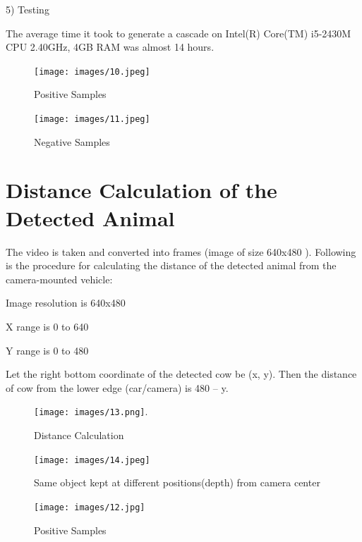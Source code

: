 \documentclass[14pt,a4paper,final]{extreport}
\begin{document}
\item 5) Testing

\item The average time it took to generate a cascade on Intel(R) Core(TM) i5-2430M CPU 2.40GHz, 4GB RAM was almost 14 hours.

\begin{figure}[h]
	\begin{center}
		\texttt{[image: images/10.jpeg]}
		\caption [Positive Samples]{Positive Samples}
	\end{center}
\end{figure}
\begin{figure}[h]
	\begin{center}
		\texttt{[image: images/11.jpeg]}
		\caption [Negative Samples]{Negative Samples}
	\end{center}
\end{figure}


\chapter{Distance Calculation of the Detected Animal}
\item The video is taken and converted into frames (image of size 640x480 ). Following is the procedure for calculating the distance of the detected animal from the camera-mounted vehicle:

\item Image resolution is 640x480

X range is 0 to 640

Y range is 0 to 480

Let the right bottom coordinate of the detected cow be (x, y). Then the distance of cow from the lower edge (car/camera) is 480 – y.

\begin{figure}[h]
	\begin{center}
		\texttt{[image: images/13.png]}.
		\caption [Distance Calculation]{Distance Calculation}
	\end{center}
\end{figure}
\begin{figure}[h]
	\begin{center}
		\texttt{[image: images/14.jpeg]}
		\caption [Same object kept at different positions(depth) from camera center]{Same object kept at different positions(depth) from camera center}
		\vspace{.5cm}
	\end{center}
\end{figure}
\begin{figure}[h]
	\begin{center}
		\texttt{[image: images/12.jpg]}
		\caption [Positive Samples]{Positive Samples}
	\end{center}
\end{figure}
\end{document}
